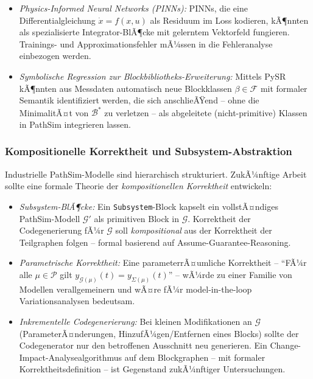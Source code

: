﻿\documentclass[12pt,a4paper]{article}
\theoremstyle{definition}
\begin{document}
\begin{itemize}
  \item \emph{Physics-Informed Neural Networks (PINNs):} PINNs, die
        eine Differentialgleichung $\dot{x} = f(x,u)$ als Residuum im
        Loss kodieren, kÃ¶nnten als spezialisierte Integrator-BlÃ¶cke
        mit gelerntem Vektorfeld fungieren. Trainings- und
        Approximationsfehler mÃ¼ssen in die Fehleranalyse einbezogen
        werden.

  \item \emph{Symbolische Regression zur Blockbibliotheks-Erweiterung:}
        Mittels PySR kÃ¶nnten aus Messdaten automatisch neue Blockklassen
        $\beta \in \mathcal{F}$ mit formaler Semantik identifiziert
        werden, die sich anschlieÃŸend -- ohne die MinimalitÃ¤t von
        $\mathcal{B}^*$ zu verletzen -- als abgeleitete (nicht-primitive)
        Klassen in PathSim integrieren lassen.
\end{itemize}

\subsubsection{Kompositionelle Korrektheit und Subsystem-Abstraktion}

Industrielle PathSim-Modelle sind hierarchisch strukturiert.
ZukÃ¼nftige Arbeit sollte eine formale Theorie der
\emph{kompositionellen Korrektheit} entwickeln:

\begin{itemize}
  \item \emph{Subsystem-BlÃ¶cke:} Ein \texttt{Subsystem}-Block kapselt
        ein vollstÃ¤ndiges PathSim-Modell $\mathcal{G}'$ als primitiven
        Block in $\mathcal{G}$. Korrektheit der Codegenerierung fÃ¼r
        $\mathcal{G}$ soll \emph{kompositional} aus der Korrektheit der
        Teilgraphen folgen -- formal basierend auf
        Assume-Guarantee-Reasoning.

  \item \emph{Parametrische Korrektheit:} Eine parameterrÃ¤umliche
        Korrektheit -- ``FÃ¼r alle $\mu \in \mathcal{P}$ gilt
        $y_{\mathcal{G}(\mu)}(t) = y_{\Sigma(\mu)}(t)$'' -- wÃ¼rde
         zu einer Familie von Modellen verallgemeinern
        und wÃ¤re fÃ¼r model-in-the-loop Variationsanalysen bedeutsam.

  \item \emph{Inkrementelle Codegenerierung:} Bei kleinen
        Modifikationen an $\mathcal{G}$ (ParameterÃ¤nderungen,
        HinzufÃ¼gen/Entfernen eines Blocks) sollte der Codegenerator
        nur den betroffenen Ausschnitt neu generieren. Ein
        Change-Impact-Analysealgorithmus auf dem Blockgraphen -- mit
        formaler Korrektheitsdefinition -- ist Gegenstand zukÃ¼nftiger
        Untersuchungen.
\end{itemize}
\end{document}
